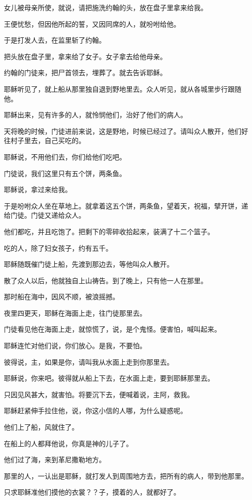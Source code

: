 \documentclass[12pt,oneside]{book}
\begin{document}
女儿被母亲所使，就说，请把施洗约翰的头，放在盘子里拿来给我。

王便忧愁，但因他所起的誓，又因同席的人，就吩咐给他。

于是打发人去，在监里斩了约翰。

把头放在盘子里，拿来给了女子。女子拿去给他母亲。

约翰的门徒来，把尸首领去，埋葬了。就去告诉耶稣。

耶稣听见了，就上船从那里独自退到野地里去。众人听见，就从各城里步行跟随他。

耶稣出来，见有许多的人，就怜悯他们，治好了他们的病人。

天将晚的时候，门徒进前来说，这是野地，时候已经过了。请叫众人散开，他们好往村子里去，自己买吃的。

耶稣说，不用他们去，你们给他们吃吧。

门徒说，我们这里只有五个饼，两条鱼。

耶稣说，拿过来给我。

于是吩咐众人坐在草地上。就拿着这五个饼，两条鱼，望着天，祝福，擘开饼，递给门徒。门徒又递给众人。

他们都吃，并且吃饱了。把剩下的零碎收拾起来，装满了十二个篮子。

吃的人，除了妇女孩子，约有五千。

耶稣随既催门徒上船，先渡到那边去，等他叫众人散开。

散了众人以后，他就独自上山祷告。到了晚上，只有他一人在那里。

那时船在海中，因风不顺，被浪摇撼。

夜里四更天，耶稣在海面上走，往门徒那里去。

门徒看见他在海面上走，就惊慌了，说，是个鬼怪。便害怕，喊叫起来。

耶稣连忙对他们说，你们放心。是我，不要怕。

彼得说，主，如果是你，请叫我从水面上走到你那里去。

耶稣说，你来吧。彼得就从船上下去，在水面上走，要到耶稣那里去。

只因见风甚大，就害怕。将要沉下去，便喊着说，主阿，救我。

耶稣赶紧伸手拉住他，说，你这小信的人哪，为什么疑惑呢。

他们上了船，风就住了。

在船上的人都拜他说，你真是神的儿子了。

他们过了海，来到革尼撒勒地方。

那里的人，一认出是耶稣，就打发人到周围地方去，把所有的病人，带到他那里。

只求耶稣准他们摸他的衣裳？？子，摸着的人，就都好了。
\end{document}
